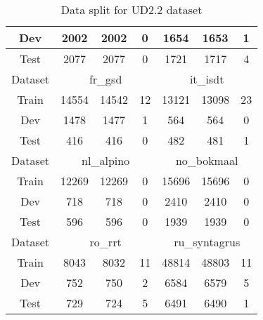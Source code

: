 \begin{table}[h]
{\begin{tabular}{ccccccc}
Dev     & 2002      & 2002      & 0      & 1654        & 1653       & 1      \\ \hline
Test    & 2077      & 2077      & 0      & 1721        & 1717       & 4      \\ \hline
Dataset & \multicolumn{3}{c}{fr\_gsd}    & \multicolumn{3}{c}{it\_isdt}      \\ \hline
Train   & 14554     & 14542     & 12     & 13121       & 13098      & 23     \\ \hline
Dev     & 1478      & 1477      & 1      & 564         & 564        & 0      \\ \hline
Test    & 416       & 416       & 0      & 482         & 481        & 1      \\ \hline
Dataset & \multicolumn{3}{c}{nl\_alpino} & \multicolumn{3}{c}{no\_bokmaal}   \\ \hline
Train   & 12269     & 12269     & 0      & 15696       & 15696      & 0      \\ \hline
Dev     & 718       & 718       & 0      & 2410        & 2410       & 0      \\ \hline
Test    & 596       & 596       & 0      & 1939        & 1939       & 0      \\ \hline
Dataset & \multicolumn{3}{c}{ro\_rrt}    & \multicolumn{3}{c}{ru\_syntagrus} \\ \hline
Train   & 8043      & 8032      & 11     & 48814       & 48803      & 11     \\ \hline
Dev     & 752       & 750       & 2      & 6584        & 6579       & 5      \\ \hline
Test    & 729       & 724       & 5      & 6491        & 6490       & 1      \\ \hline
\end{tabular}}

\caption{Data split for UD2.2 dataset}
\end{table}